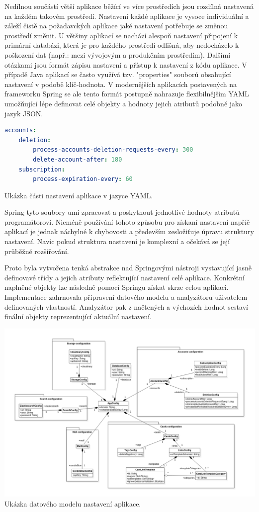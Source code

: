 \begin{itemize}
\begin{itemize}
		Nedílnou součástí větší aplikace běžící ve více prostředích jsou rozdílná nastavená na každém takovém prostředí.
		Nastavení každé aplikace je vysoce individuální a záleží čistě na požadavckých aplikace jaké nastavení potřebuje
		se změnou prostředí změnit.
		U většiny aplikací se nachází alespoň nastavení připojení k primární databázi, která je pro každého prostředí
		odlišná, aby nedocházelo k poškození dat (např.: mezi vývojovým a produkčním prostředím).
		Dalšími otázkami jsou formát zápisu nastavení a přístup k nastavení z kódu aplikace.
		V případě Java aplikací se často využívá tzv. "properties" souborů obsahující nastavení v podobě klíč-hodnota.
		V modernějších aplikacích postavených na frameworku Spring se ale tento formát postupně nahrazuje flexibilnějším
		\ac{YAML} umožňující lépe definovat celé objekty a hodnoty jejich atributů podobně jako jazyk \ac{JSON}.

		\begin{lstlisting}[language=YAML]
accounts:
	deletion:
		process-accounts-deletion-requests-every: 300
		delete-account-after: 180
	subscription:
		process-expiration-every: 60
		\end{lstlisting}
		Ukázka části nastavení aplikace v jazyce YAML. %

		Spring tyto soubory umí zpracovat a poskytnout jednotlivé hodnoty atributů programátorovi.
		Nicméně používání tohoto způsobu pro získaní nastavení napříč aplikací je jednak náchylné k chybovosti a
		především zesložiťuje úpravu struktury nastavení.
		Navíc pokud struktura nastavení je komplexní a očekává se její průběžné rozšířování.

		Proto byla vytvořena tenká abstrakce nad Springovými nástroji vystavující jasně definovavé třídy a jejich atributy
		reflektující nastavení celé aplikace.
		Konkrétní naplněné objekty lze následně pomocí Springu získat skrze celou aplikaci.
		Implementace zahrnovala připravení datového modelu a analyzátoru uživatelem definovaných vlastností.
		Analyzátor pak z načtených a výchozích hodnot sestaví finální objekty reprezentující aktuální nastavení.

		\includegraphics{obrazky/datovy_model_nastaveni_aplikace}\hfill
		Ukázka datového modelu nastavení aplikace. %


\end{itemize}
\end{itemize}
